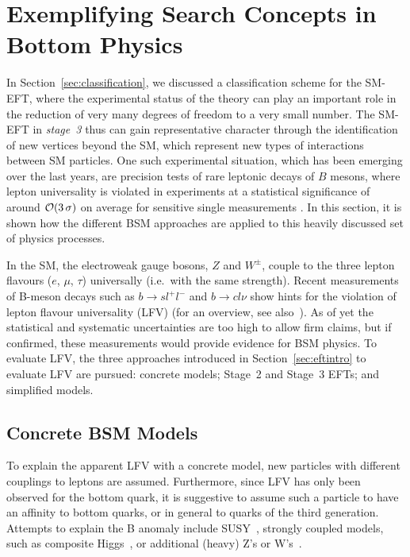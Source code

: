 \section{Exemplifying Search Concepts in Bottom Physics}\label{sec:BphysicsConcepts}

In Section~\ref{sec:classification}, we discussed a classification
scheme for the SM-EFT, where the experimental status of the theory can
play an important role in the reduction of very many degrees of
freedom to a very small number. The SM-EFT in \emph{stage~3} thus can
gain representative character through the identification of new
vertices beyond the SM, which represent new types of interactions
between SM particles. One such experimental situation, which has been
emerging over the last years, are precision tests of rare leptonic
decays of $B$ mesons, where lepton universality is
violated in experiments
at a statistical significance of around ${\cal O}(3\,\sigma)$ on
average for sensitive single measurements \citep{Aaij:2015oid,Aaij:2017vbb,Aaij:2019wad,Abdesselam:2019dgh,Abdesselam:2019wac,Buttazzo:2017ixm}.
In this section, it is shown how the different BSM approaches are applied to this heavily discussed set of physics processes.

In the SM, the electroweak gauge bosons, $Z$ and $W^\pm$, couple to
the three lepton flavours ($e$, $\mu$, $\tau$) universally (i.e.\ with
the same strength).  Recent measurements of B-meson decays such as
$b \to sl^+l^-$ and $b \to c l \nu$ show hints for the violation of
lepton flavour universality (LFV) (for an overview, see
also~\citep{Albrecht:2018frt}).  As of yet the statistical and systematic
uncertainties are too high to allow firm claims, but if confirmed,
these measurements would provide evidence for BSM physics. To evaluate
LFV, the three approaches introduced in
Section~\ref{sec:eftintro} to evaluate LFV are pursued: concrete
models; Stage~2 and Stage~3 EFTs; and
simplified models. 

\subsection{Concrete BSM Models}
\label{sec:B-con-BSM}

To explain the apparent LFV with a concrete model, new particles with
different couplings to leptons are assumed.  Furthermore, since LFV
has only been observed for the bottom quark, it is suggestive to
assume such a particle to have an affinity to bottom quarks, or in
general to quarks of the third generation.  Attempts to explain the B
anomaly include SUSY~\citep{Altmannshofer:2017poe}, strongly
coupled models, such as composite Higgs~\citep{Greljo:2015mma}, or
additional (heavy) Z's or W's~\citep{Boucenna:2016qad}.

